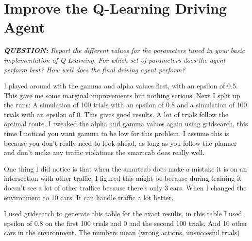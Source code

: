 \documentclass[11pt]{article}
\begin{document}
\section{Improve the Q-Learning Driving Agent}
\begin{center}
\textit{\textbf{QUESTION:} Report the different values for the parameters tuned in your basic implementation of Q-Learning. For which set of parameters does the agent perform best? How well does the final driving agent perform?}
\end{center}
 I played around with the gamma and alpha values first, with an epsilon of 0.5. This gave me some marginal improvements but nothing serious. Next I split up the runs: A simulation of 100 trials with an epsilon of 0.8 and a simulation of 100 trials with an epsilon of 0. This gives good results. A lot of trials follow the optimal route. I tweaked the alpha and gamma values again using gridsearch, this time I noticed you want gamma to be low for this problem. I assume this is because you don't really need to look ahead, as long as you follow the planner and don't make any traffic violations the smartcab does really well. \par
One thing I did notice is that when the smartcab does make a mistake it is on an intersection with other traffic. I figured this might be because during training it doesn't see a lot of other traffice because there's only 3 cars. When I changed the environment to 10 cars. It can handle traffic a lot better.

 I used gridsearch to generate this table for the exact results, in this table I used epsilon of  0.8 on the first 100 trials and 0 and the second 100 trials. And 10 other cars in the environment. The numbers mean (wrong actions, unsuccesful trials)\par
 
\end{document}
